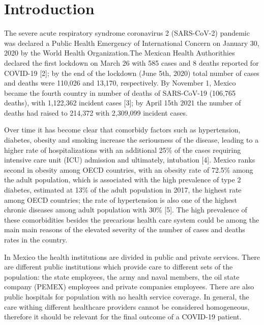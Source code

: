 \documentclass[10pt,letterpaper]{article}
\begin{document}
\linenumbers

\newcommand{\N}{\mathbb{N}}
\newcommand{\Z}{\mathbb{Z}}
\newcommand{\R}{\mathbb{R}}
\newcommand{\Q}{\mathbb{Q}}
\newcommand{\vac}{\varnothing}
\newcommand{\Pro}{\mathbb{P}}
\newcommand{\var}{\text{Var}}
\newcommand{\E}{\mathbb{E}}

\hypertarget{introduction}{%
\section{Introduction}\label{introduction}}

The severe acute respiratory syndrome coronavirus 2 (SARS-CoV-2) pandemic was declared a Public Health Emergency of
International Concern on January 30, 2020 by the World Health
Organization.The Mexican Health Authorithies declared the first lockdown
on March 26 with 585 cases and 8 deaths reported for COVID-19 {[}2{]};
by the end of the lockdown (June 5th, 2020) total number of cases and deaths were 110,026 and 13,170, respectively. By November 1, Mexico became the fourth country in
number of deaths of SARS-CoV-19 (106,765 deaths), with 1,122,362 incident
cases {[}3{]}; by April 15th  2021 the number of deaths had raised to 214,372 with 2,309,099 incident cases. 
 
Over time it has become clear that comorbidy factors such as
hypertension, diabetes, obesity and smoking increase
the seriousness of the disease, leading to a higher rate of hospitalizations with an additional 25\% of the
cases requiring intensive care unit (ICU) admission and ultimately, intubation {[}4{]}. Mexico ranks second in obesity among OECD countries, with an obesity rate of 72.5\%  among the adult population, which is associated
with the high prevalence of type 2 diabetes, estimated at 13\% of the
adult population in 2017, the highest rate among OECD
countries; the rate of hypertension is also one of the highest chronic diseases among
adult population with 30\% {[}5{]}. The high prevalence of these comorbidities
besides the precarious health care system could be among the main 
main reasons of the elevated severity of the number of cases and deaths rates in the country.  

In Mexico the health institutions are divided in public and private services. There are different public institutions which provide care to different sets of the population: the state employees, the army and naval members, the oil state company (PEMEX) employees and private companies employees. There are also public hospitals for population with no health service coverage. In general, the care withing different healthcare providers cannot be considered homogeneous, therefore it should be relevant for the final outcome of a COVID-19  patient.  
\end{document}
